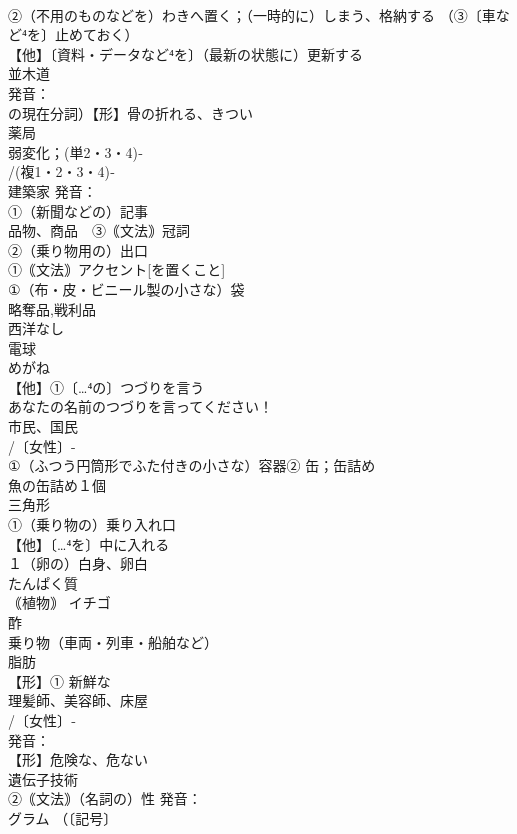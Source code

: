 \documentclass[8pt]{extreport}
\begin{document}
\begin{CJK}{UTF8}{min}
\\	②（不用のものなどを）わきへ置く；（一時的に）しまう、格納する （③〔車など⁴を〕止めておく） 
\\	【他】〔資料・データなど⁴を〕（最新の状態に）更新する 
\\	並木道　
\\	発音：
\\	の現在分詞）【形】骨の折れる、きつい
\\	薬局 
\\	弱変化；(単2・3・4)‐
\\	/(複1・2・3・4)‐
\\	建築家 発音：
\\	①（新聞などの）記事
\\	品物、商品　③｟文法｠冠詞 
\\	②（乗り物用の）出口 
\\	①｟文法｠アクセント[を置くこと] 
\\	①（布・皮・ビニール製の小さな）袋 
\\	略奪品,戦利品
\\	西洋なし 
\\	電球
\\	めがね 
\\	【他】①〔…⁴の〕つづりを言う 
\\	あなたの名前のつづりを言ってください！
\\	市民、国民 
\\	/〔女性〕-
\\	①（ふつう円筒形でふた付きの小さな）容器② 缶；缶詰め 
\\	魚の缶詰め１個
\\	三角形 
\\	①（乗り物の）乗り入れ口 
\\	【他】〔…⁴を〕中に入れる
\\	１（卵の）白身、卵白　
\\	たんぱく質
\\	｟植物｠ イチゴ
\\	酢 
\\	乗り物（車両・列車・船舶など）
\\	脂肪
\\	【形】① 新鮮な 
\\	理髪師、美容師、床屋 
\\	/〔女性〕‐
\\	発音：
\\	【形】危険な、危ない 
\\	遺伝子技術
\\	②｟文法｠（名詞の）性 発音：
\\	グラム （〔記号〕

\end{CJK}
\end{document}
